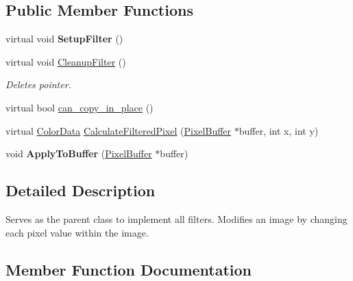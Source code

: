 \subsection*{Public Member Functions}
\begin{DoxyCompactItemize}
\item 
\mbox{\label{classimage__tools_1_1Filter_af621f9c2221e0a5310322413f0adfca5}} 
virtual void {\bfseries Setup\+Filter} ()
\item 
\mbox{\label{classimage__tools_1_1Filter_abb92717e3b5d762720d8a80f6b10dd5d}} 
virtual void \hyperlink{classimage__tools_1_1Filter_abb92717e3b5d762720d8a80f6b10dd5d}{Cleanup\+Filter} ()
\begin{DoxyCompactList}\small\item\em Deletes pointer. \end{DoxyCompactList}\item 
virtual bool \hyperlink{classimage__tools_1_1Filter_abb21c6ce1f09a4ce4fbd38255c44d281}{can\+\_\+copy\+\_\+in\+\_\+place} ()
\item 
virtual \hyperlink{classimage__tools_1_1ColorData}{Color\+Data} \hyperlink{classimage__tools_1_1Filter_a68d38fa12b87e20b81090cb380c0a307}{Calculate\+Filtered\+Pixel} (\hyperlink{classimage__tools_1_1PixelBuffer}{Pixel\+Buffer} $\ast$buffer, int x, int y)
\item 
\mbox{\label{classimage__tools_1_1Filter_a2e546a29d5c7dc1d7fff50d0f06b4c2b}} 
void {\bfseries Apply\+To\+Buffer} (\hyperlink{classimage__tools_1_1PixelBuffer}{Pixel\+Buffer} $\ast$buffer)
\end{DoxyCompactItemize}


\subsection{Detailed Description}
Serves as the parent class to implement all filters. Modifies an image by changing each pixel value within the image. 

\subsection{Member Function Documentation}
\mbox{\label{classimage__tools_1_1Filter_a68d38fa12b87e20b81090cb380c0a307}} 
